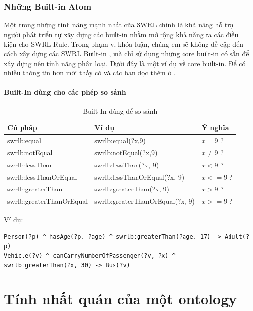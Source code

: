 \subsubsection{Những Built-in Atom}
Một trong những tính năng mạnh nhất của SWRL chính là khả năng hỗ trợ người phát triển tự xây dựng các built-in nhằm mở rộng khả năng ra các điều kiện cho SWRL Rule. Trong phạm vi khóa luận, chúng em sẽ không đề cập đến cách xây dựng các SWRL Built-in \cite{swrlbuiltin}, mà chỉ sử dụng những core built-in \cite{swrlcorebuiltin} có sẵn để xây dựng nên tính năng phân loại. Dưới đây là một ví dụ về core built-in. Để có nhiều thông tin hơn mời thầy cô và các bạn đọc thêm ở \cite{swrlcorebuiltin}.
\paragraph{Built-In dùng cho các phép so sánh}
\begin{table}[!h]
	\centering
	\begin{tabular}{|l|l|l|}
		\hline
		Cú pháp & Ví dụ & Ý nghĩa \\ 
		\hline
		swrlb:equal & swrlb:equal(?x,9) & $x = 9$  ? \\		
		\hline
		swrlb:notEqual & swrlb:notEqual(?x,9) & $x \neq 9$  ? \\		
		\hline
		swrlb:lessThan & swrlb:lessThan(?x, 9) & $x < 9$ ? \\
		\hline
		swrlb:lessThanOrEqual & swrlb:lessThanOrEqual(?x, 9) & $x <= 9$ ? \\
		\hline
		swrlb:greaterThan & swrlb:greaterThan(?x, 9) & $x > 9$ ? \\
		\hline
		swrlb:greaterThanOrEqual & swrlb:greaterThanOrEqual(?x, 9) & $x >= 9$ ? \\
		\hline
	\end{tabular}
	\caption{Built-In dùng để so sánh\label{overflow}}
\end{table}
Ví dụ:
\begin{verbatim}
Person(?p) ^ hasAge(?p, ?age) ^ swrlb:greaterThan(?age, 17) -> Adult(?p)
Vehicle(?v) ^ canCarryNumberOfPassenger(?v, ?x) ^ 
swrlb:greaterThan(?x, 30) -> Bus(?v)
\end{verbatim}
\section{Tính nhất quán của một ontology}
